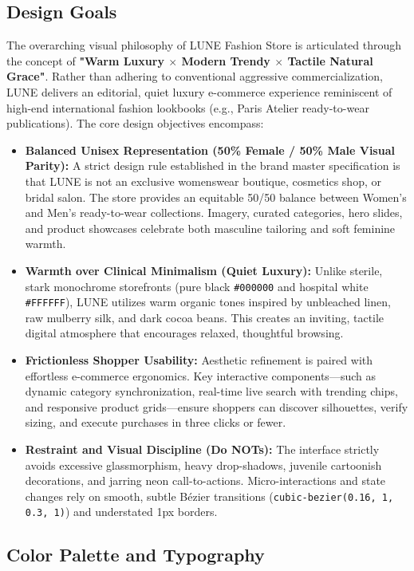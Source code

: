 \documentclass[12pt,a4paper,oneside]{report}
\begin{document}
\subsection{Design Goals}
The overarching visual philosophy of LUNE Fashion Store is articulated through the concept of \textbf{"Warm Luxury $\times$ Modern Trendy $\times$ Tactile Natural Grace"}. Rather than adhering to conventional aggressive commercialization, LUNE delivers an editorial, quiet luxury e-commerce experience reminiscent of high-end international fashion lookbooks (e.g., Paris Atelier ready-to-wear publications). The core design objectives encompass:
\begin{itemize}[leftmargin=1.2cm]
    \item \textbf{Balanced Unisex Representation (50\% Female / 50\% Male Visual Parity):} A strict design rule established in the brand master specification is that LUNE is not an exclusive womenswear boutique, cosmetics shop, or bridal salon. The store provides an equitable 50/50 balance between Women's and Men's ready-to-wear collections. Imagery, curated categories, hero slides, and product showcases celebrate both masculine tailoring and soft feminine warmth.
    \item \textbf{Warmth over Clinical Minimalism (Quiet Luxury):} Unlike sterile, stark monochrome storefronts (pure black \texttt{\#000000} and hospital white \texttt{\#FFFFFF}), LUNE utilizes warm organic tones inspired by unbleached linen, raw mulberry silk, and dark cocoa beans. This creates an inviting, tactile digital atmosphere that encourages relaxed, thoughtful browsing.
    \item \textbf{Frictionless Shopper Usability:} Aesthetic refinement is paired with effortless e-commerce ergonomics. Key interactive components---such as dynamic category synchronization, real-time live search with trending chips, and responsive product grids---ensure shoppers can discover silhouettes, verify sizing, and execute purchases in three clicks or fewer.
    \item \textbf{Restraint and Visual Discipline (Do NOTs):} The interface strictly avoids excessive glassmorphism, heavy drop-shadows, juvenile cartoonish decorations, and jarring neon call-to-actions. Micro-interactions and state changes rely on smooth, subtle B\'{e}zier transitions (\texttt{cubic-bezier(0.16, 1, 0.3, 1)}) and understated 1px borders.
\end{itemize}

\subsection{Color Palette and Typography}
\end{document}
